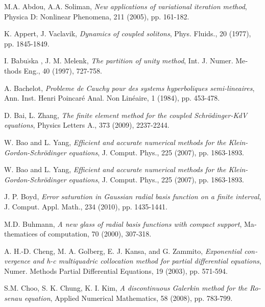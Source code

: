 %
%
%
%
\begin{thebibliography}{99} 						
%
\begin{latin} 	


\bibitem{[68]} {\sc M.A. Abdou, A.A. Soliman},  {\em New applications of variational iteration
method},  Physica D: Nonlinear Phenomena, 211 (2005), pp. 161-182.

\bibitem{[69]} {\sc K. Appert, J. Vaclavik}, {\em Dynamics of coupled solitons}, Phys. Fluids., 20 (1977), pp.
1845-1849.

\bibitem{[15]} {\sc I. Babu$\check{s}$ka , J. M. Melenk}, {\em The partition of unity method}, Int. J. Numer.
Methods Eng., 40 (1997), 727-758.

\bibitem{[63]} {\sc A. Bachelot},  {\em Probleme de Cauchy pour des systems hyperboliques semi-lineaires}, Ann. Inst. Henri
Poincaré Anal. Non Linéaire, 1 (1984), pp. 453-478.

\bibitem{[70]} {\sc D. Bai, L. Zhang}, {\em The finite element method for the coupled Schr\"{o}dinger-KdV
equations}, Physics Letters A., 373 (2009),  2237-2244.

\bibitem {[67]} {\sc W. Bao and L. Yang}, {\em Efficient and accurate numerical methods for the Klein-Gordon-Schr\"{o}dinger equations},
J. Comput. Phys., 225 (2007), pp. 1863-1893.

\bibitem {[25]} {\sc W. Bao and L. Yang}, {\em Efficient and accurate numerical methods for the Klein-Gordon-Schr\"{o}dinger equations},
J. Comput. Phys., 225 (2007), pp. 1863-1893.

\bibitem {[34]} {\sc J. P. Boyd}, {\em Error saturation in Gaussian radial basis function on a finite interval},
J. Comput. Appl. Math., 234 (2010), pp. 1435-1441.

\bibitem{[3]} {\sc M.D. Buhmann}, {\em A new glass of radial basis functions
with compact support}, Mathematices of computation, 70 (2000),
307-318.

\bibitem{[4]} {\sc A. H.-D. Cheng, M. A. Golberg, E. J. Kansa, and G.
Zammito}, {\em Exponential convergence and h-c multiquadric
collocation method for partial differential equations}, Numer.
Methods Partial Differential Equations, 19 (2003), pp. 571-594.

\bibitem {[82]} {\sc S.M. Choo, S. K. Chung, K. I. Kim}, {\em A discontinuous Galerkin
 method for the Rosenau equation}, Applied Numerical Mathematics, 58 (2008), pp. 783-799.


\end{latin}
\end{thebibliography}
